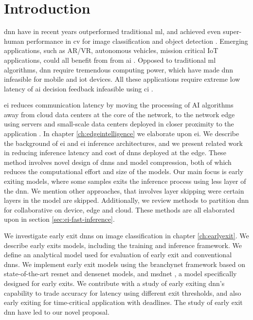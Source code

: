 \hypertarget{introduction}{%
\chapter{Introduction}\label{ch:introduction}}

\gls{dnn} have in recent years outperformed traditional \gls{ml}, and achieved even super-human performance in \gls{cv} for image classification and object detection \cite{russakovsky_imagenet_2015}. Emerging applications, such as AR/VR, autonomous vehicles, mission critical IoT applications, could all benefit from from \gls{ai} \cite{pettey_immersive_2018}. Opposed to traditional \gls{ml} algorithms, \gls{dnn} require tremendous computing power, which have made \gls{dnn} infeasible for mobile and \gls{iot} devices. All these applications require extreme low latency of \gls{ai} decision feedback infeasible using \gls{ci} \cite{zhou_edge_2019}. 

\acrlong{ei} reduces communication latency by moving the processing of AI algorithms away from cloud data centers at the core of the network, to the network edge using servers and small-scale data centers deployed in closer proximity to the application \cite{shi_edge_2016}. In chapter \ref{ch:edgeintelligence} we elaborate upon \gls{ei}. We describe the background of \gls{ei} and \gls{ei} inference architectures, and we present related work in reducing inference latency and cost of \gls{dnn}s deployed at the edge. These method involves novel design of \gls{dnn}s and model compression, both of which reduces the computational effort and size of the models. Our main focus is early exiting models, where some samples exits the inference process using less layer of the \gls{dnn}. We mention other approaches, that involves layer skipping were certain layers in the model are skipped. Additionally, we review methods to partition \gls{dnn} for collaborative on device, edge and cloud. These methods are all elaborated upon in section \ref{sec:ei-fast-inference}. 

We investigate early exit \gls{dnn}s on image classification in chapter \ref{ch:earlyexit}. We describe early exits models, including the training and inference framework. We define an analytical model used for evaluation of early exit and conventional \gls{dnn}s. We implement early exit models using the \gls{branchynet} framework \cite{teerapittayanon_branchynet:_2016} based on state-of-the-art \gls{resnet} \cite{he_deep_2015} and \gls{densenet} \cite{huang_densely_2016} models, and \gls{msdnet} \cite{huang_multi-scale_2017}, a model specifically designed for early exits. We contribute with a study of early exiting \gls{dnn}'s capability to trade accuracy for latency using different exit thresholds, and also early exiting for time-critical application with deadlines. The study of early exit \gls{dnn} have led to our novel proposal.

